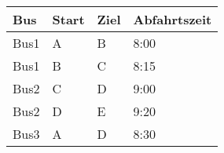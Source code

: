 \begin{tabular}{llll}
\toprule
Bus & Start & Ziel & Abfahrtszeit \\
\midrule
Bus1 & A & B & 8:00 \\
Bus1 & B & C & 8:15 \\
Bus2 & C & D & 9:00 \\
Bus2 & D & E & 9:20 \\
Bus3 & A & D & 8:30 \\
\bottomrule
\end{tabular}
